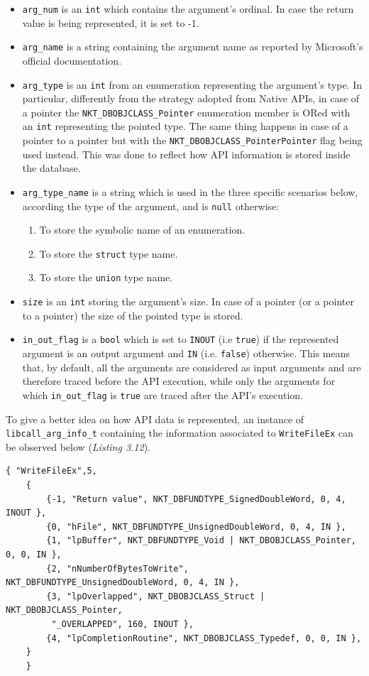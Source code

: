 \begin{itemize}
\item \texttt{arg\_num} is an \texttt{int} which contains the argument's ordinal. In case the return value is being represented, it is set to -1.
\item \texttt{arg\_name} is a string containing the argument name as reported by Microsoft's official documentation.
\item \texttt{arg\_type} is an \texttt{int} from an enumeration representing the argument's type. In particular, differently from the strategy adopted from Native APIs, in case of a pointer the \texttt{NKT\_DBOBJCLASS\_Pointer} enumeration member is ORed with an \texttt{int} representing the pointed type. The same thing happens in case of a pointer to a pointer but with the \texttt{NKT\_DBOBJCLASS\_PointerPointer} flag being used instead. This was done to reflect how API information is stored inside the database.
\item \texttt{arg\_type\_name} is a string which is used in the three specific scenarios below, according the type of the argument, and is \texttt{null} otherwise:
\begin{enumerate}
\item To store the symbolic name of an enumeration.
\item To store the \texttt{struct} type name.
\item To store the \texttt{union} type name.
\end{enumerate}
\item \texttt{size} is an \texttt{int} storing the argument's size. In case of a pointer (or a pointer to a pointer) the size of the pointed type is stored.
\item \texttt{in\_out\_flag} is a \texttt{bool} which is set to \texttt{INOUT} (i.e \texttt{true}) if the represented argument is an output argument and \texttt{IN} (i.e. \texttt{false}) otherwise. This means that, by default, all the arguments are considered as input arguments and are therefore traced before the API execution, while only the arguments for which \texttt{in\_out\_flag} is \texttt{true} are traced after the API's execution.
\end{itemize}

To give a better idea on how API data is represented, an instance of \texttt{libcall\_arg\_info\_t} containing the information associated to \texttt{WriteFileEx} can be observed below (\textit{Listing 3.12}).
\\
\begin{lstlisting}[caption={Instance of \texttt{libcall\_arg\_info\_t} relative to \texttt{WriteFileEx}},captionpos=b]
	{ "WriteFileEx",5,
	{ 
		{-1, "Return value", NKT_DBFUNDTYPE_SignedDoubleWord, 0, 4, INOUT },
		{0, "hFile", NKT_DBFUNDTYPE_UnsignedDoubleWord, 0, 4, IN },
		{1, "lpBuffer", NKT_DBFUNDTYPE_Void | NKT_DBOBJCLASS_Pointer, 0, 0, IN },
		{2, "nNumberOfBytesToWrite", NKT_DBFUNDTYPE_UnsignedDoubleWord, 0, 4, IN },
		{3, "lpOverlapped", NKT_DBOBJCLASS_Struct | NKT_DBOBJCLASS_Pointer,
		 "_OVERLAPPED", 160, INOUT },
		{4, "lpCompletionRoutine", NKT_DBOBJCLASS_Typedef, 0, 0, IN },
	}
	}
\end{lstlisting}

